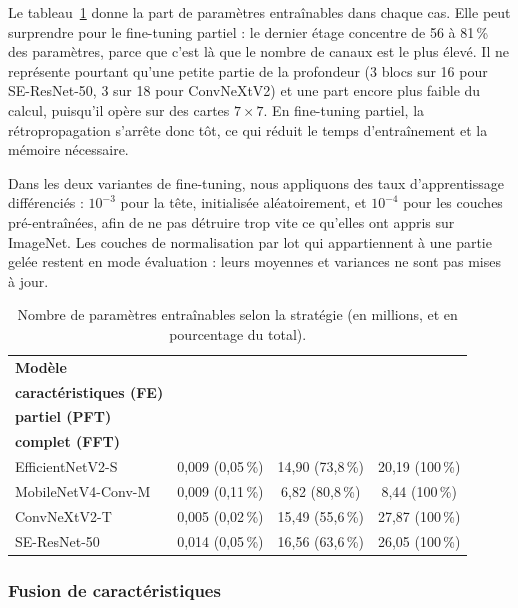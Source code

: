 Le tableau~\ref{tab:trainable} donne la part de paramètres entraînables dans chaque cas. Elle peut surprendre pour le fine-tuning partiel : le dernier étage concentre de 56 à 81\,\% des paramètres, parce que c'est là que le nombre de canaux est le plus élevé. Il ne représente pourtant qu'une petite partie de la profondeur (3 blocs sur 16 pour SE-ResNet-50, 3 sur 18 pour ConvNeXtV2) et une part encore plus faible du calcul, puisqu'il opère sur des cartes $7\times7$. En fine-tuning partiel, la rétropropagation s'arrête donc tôt, ce qui réduit le temps d'entraînement et la mémoire nécessaire.

Dans les deux variantes de fine-tuning, nous appliquons des taux d'apprentissage différenciés \cite{howard2018universal} : $10^{-3}$ pour la tête, initialisée aléatoirement, et $10^{-4}$ pour les couches pré-entraînées, afin de ne pas détruire trop vite ce qu'elles ont appris sur ImageNet. Les couches de normalisation par lot qui appartiennent à une partie gelée restent en mode évaluation : leurs moyennes et variances ne sont pas mises à jour.

\begin{table}[htbp]
\centering
\caption{Nombre de paramètres entraînables selon la stratégie (en millions, et en pourcentage du total).}
\label{tab:trainable}
\small
\begin{tabular}{lccc}
\toprule
\textbf{Modèle} & \makecell{\textbf{Extraction de}\\\textbf{caractéristiques (FE)}} & \makecell{\textbf{Fine-tuning}\\\textbf{partiel (PFT)}} & \makecell{\textbf{Fine-tuning}\\\textbf{complet (FFT)}} \\
\midrule
EfficientNetV2-S & 0,009 (0,05\,\%) & 14,90 (73,8\,\%) & 20,19 (100\,\%) \\
MobileNetV4-Conv-M & 0,009 (0,11\,\%) & 6,82 (80,8\,\%) & 8,44 (100\,\%) \\
ConvNeXtV2-T & 0,005 (0,02\,\%) & 15,49 (55,6\,\%) & 27,87 (100\,\%) \\
SE-ResNet-50 & 0,014 (0,05\,\%) & 16,56 (63,6\,\%) & 26,05 (100\,\%) \\
\bottomrule
\end{tabular}
\end{table}

\subsubsection{Fusion de caractéristiques}
\label{sec:fusion}

